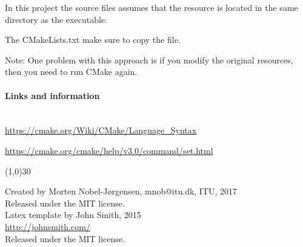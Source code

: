 \documentclass[11pt,a4paper,landscape]{scrartcl} %
\newcommand{\sectiontitle}[1]{\paragraph{#1} \ \\} %
\begin{document}
\begin{multicols}{2}
In this project the source files assumes that the resource is located in the same directory as the executable:



The CMakeLists.txt make sure to copy the file. 



Note: One problem with this approach is if you modify the original resources, then you need to run CMake again.

\vspace{\baselineskip} %


\sectiontitle{Links and information}

\url{https://cmake.org/Wiki/CMake/Language_Syntax}

\url{https://cmake.org/cmake/help/v3.0/command/set.html}


\vspace{\baselineskip}
\linethickness{0.5mm} %
{\color{mygray}\line(1,0){30}} %

\footnotesize{
Created by Morten Nobel-Jørgensen, mnob@itu.dk, ITU, 2017\\ 

Released under the MIT license. \\

Latex template by John Smith, 2015\\ 
\url{http://johnsmith.com/}\\
				
Released under the MIT license.
}

\end{multicols}

\end{document}

